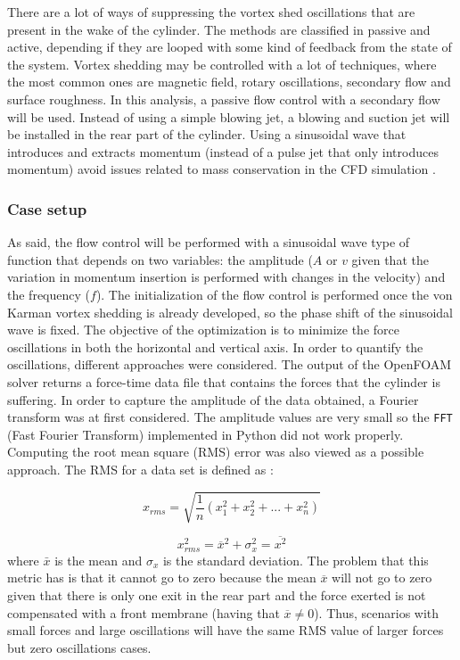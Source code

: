 \newpage

There are a lot of ways of suppressing the vortex shed oscillations that are present in the wake of the cylinder. The methods are classified in passive and active, depending if they are looped with some kind of feedback from the state of the system. Vortex shedding may be controlled with a lot of techniques, where the most common ones are magnetic field, rotary oscillations, secondary flow and surface roughness. In this analysis, a passive flow control with a secondary flow will be used. Instead of using a simple blowing jet, a blowing and suction jet will be installed in the rear part of the cylinder. Using a sinusoidal wave that introduces and extracts momentum (instead of a pulse jet that only introduces momentum) avoid issues related to mass conservation in the CFD simulation \cite{rashidi2016vortex}.

\subsubsection*{Case setup}

As said, the flow control will be performed with a sinusoidal wave type of function that depends on two variables: the amplitude ($A$ or $v$ given that the variation in momentum insertion is performed with changes in the velocity) and the frequency ($f$). The initialization of the flow control is performed once the von Karman vortex shedding is already developed, so the phase shift of the sinusoidal wave is fixed. The objective of the optimization is to minimize the force oscillations in both the horizontal and vertical axis. In order to quantify the oscillations, different approaches were considered. The output of the OpenFOAM solver returns a force-time data file that contains the forces that the cylinder is suffering. In order to capture the amplitude of the data obtained, a Fourier transform was at first considered. The amplitude values are very small so the \texttt{FFT} (Fast Fourier Transform) implemented in Python did not work properly. Computing the root mean square (RMS) error was also viewed as a possible approach. The RMS for a data set is defined as \cite{bissell1992digital}:

\begin{equation}
    x_{rms}=\sqrt{\dfrac{1}{n}\left( x_1^2 + x_2^2 + ... + x_n^2 \right)}
\end{equation}

\begin{equation}
    x_{rms}^2=\overline{x}^2+\sigma_x^2=\overline{x^2}
\end{equation} 
where $\bar{x}$ is the mean and $\sigma_x$ is the standard deviation. The problem that this metric has is that it cannot go to zero because the mean $\overline{x}$ will not go to zero given that there is only one exit in the rear part and the force exerted is not compensated with a front membrane (having that $\overline{x}\neq 0$). Thus, scenarios with small forces and large oscillations will have the same RMS value of larger forces but zero oscillations cases. 

